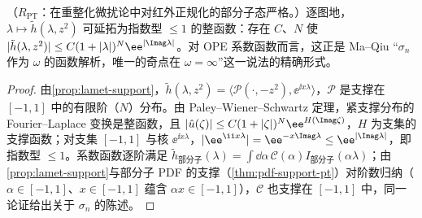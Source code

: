 \begin{corollary}\label{cor:lamet-entire}
（$R_{\mathrm{PT}}$：在重整化微扰论中对红外正规化的部分子态严格。）逐图地，$\lambda\mapsto\tilde h(\lambda,z^2)$ 可延拓为指数型 $\le1$ 的整函数：存在 $C$、$N$ 使 $|\tilde h(\lambda,z^2)|\le C(1+|\lambda|)^N\ee^{|\Imag\lambda|}$。对 OPE 系数函数而言，这正是 Ma--Qiu “$\sigma_n$ 作为 $\omega$ 的函数解析，唯一的奇点在 $\omega=\infty$”\cite{MaQiu2018}这一说法的精确形式。
\end{corollary}

\begin{proof}
由\cref{prop:lamet-support}，$\tilde h(\lambda,z^2)=\langle\mathcal P(\cdot,-z^2),\ee^{\ii x\lambda}\rangle$，$\mathcal P$ 是支撑在 $[-1,1]$ 中的有限阶（$N$）分布。由 Paley--Wiener--Schwartz 定理\cite[定理~7.3.1]{Hormander2003}，紧支撑分布的 Fourier--Laplace 变换是整函数，且 $|\hat u(\zeta)|\le C(1+|\zeta|)^N\ee^{H(\Imag\zeta)}$，$H$ 为支集的支撑函数；对支集 $[-1,1]$ 与核 $\ee^{\ii x\lambda}$，$|\ee^{\ii x\lambda}|=\ee^{-x\Imag\lambda}\le\ee^{|\Imag\lambda|}$，即指数型 $\le1$。系数函数逐阶满足 $\tilde h_{\text{部分子}}(\lambda)=\int\dd\alpha\,\mathcal C(\alpha)I_{\text{部分子}}(\alpha\lambda)$；由\cref{prop:lamet-support}与部分子 PDF 的支撑（\cref{thm:pdf-support-pt}）对阶数归纳（$\alpha\in[-1,1]$、$x\in[-1,1]$ 蕴含 $\alpha x\in[-1,1]$），$\mathcal C$ 也支撑在 $[-1,1]$ 中，同一论证给出关于 $\sigma_n$ 的陈述。
\end{proof}


